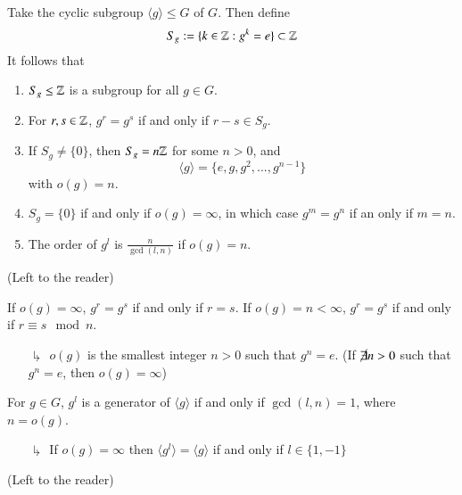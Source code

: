 \documentclass[12pt, a4paper, twoside, openright, titlepage]{book}
\begin{document}
\begin{prop}{}{}
    Take the cyclic subgroup $\langle g \rangle \leq G$ of $G$. Then define \begin{equation}
        S_g := \{k \in \mathbb Z: g^k = e\}\subset \mathbb Z
    \end{equation}
    It follows that \begin{enumerate}
        \item $S_g \leq \mathbb Z$ is a subgroup for all $g \in G$.
        \item For $r,s \in \mathbb Z$, $g^r = g^s$ if and only if $r-s \in S_g$.
        \item If $S_g \neq \{0\}$, then $S_g = n\mathbb Z$ for some $n >0$, and \begin{equation}
            \langle g \rangle = \{e,g,g^2,...,g^{n-1}\}
        \end{equation}
        with $o(g) =n$.
        \item $S_g = \{0\}$ if and only if $o(g) = \infty$, in which case $g^m = g^n$ if an only if $m = n$.
        \item The order of $g^l$ is $\frac{n}{\gcd(l,n)}$ if $o(g) = n$.
    \end{enumerate}
\end{prop}
\begin{proof*}{}{}
    (Left to the reader)
\end{proof*}

\begin{rmk}{}{}
    If $o(g) = \infty$, $g^r = g^s$ if and only if $r = s$. If $o(g) = n < \infty$, $g^r = g^s$ if and only if $r \equiv s \mod n$.
    \begin{enumerate}
        \item[$\drsh$] $o(g)$ is the smallest integer $n > 0$ such that $g^n = e$. (If $\cancel{\exists}n > 0$ such that $g^n = e$, then $o(g) = \infty$) 
    \end{enumerate}
\end{rmk}

\begin{cor}{}{}
    For $g \in G$, $g^l$ is a generator of $\langle g \rangle$ if and only if $\gcd(l,n) = 1$, where $n = o(g)$.
\end{cor}
\begin{enumerate}
    \item[$\drsh$] If $o(g) = \infty$ then $\langle g^l \rangle = \langle g \rangle$ if and only if $l \in \{1,-1\}$
\end{enumerate}
\begin{proof*}{}{}
    (Left to the reader)
\end{proof*}
\end{document}
